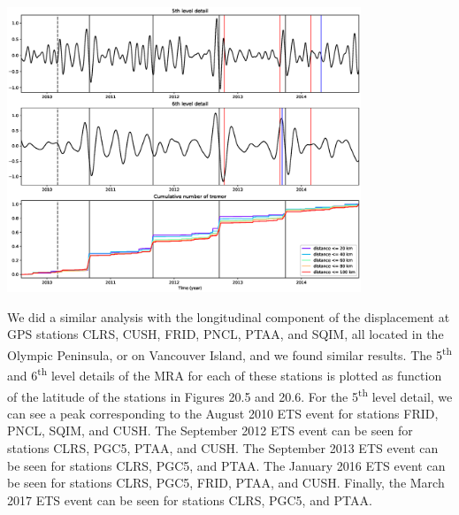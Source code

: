 \documentclass[main.tex]{subfiles}
\begin{document}
\begin{center}
\includegraphics[width=300pt, trim={3.5cm 2.5cm 3.5cm 3cm}, clip]{Figures/slowslip_results/Figure_4.eps}
\captionsetup{type=figure}
\end{center}

We did a similar analysis with the longitudinal component of the displacement at GPS stations CLRS, CUSH, FRID, PNCL, PTAA, and SQIM, all located in the Olympic Peninsula, or on Vancouver Island, and we found similar results. The 5\textsuperscript{th} and 6\textsuperscript{th} level details of the MRA for each of these stations is plotted as function of the latitude of the stations in Figures 20.5 and 20.6. For the 5\textsuperscript{th} level detail, we can see a peak corresponding to the August 2010 ETS event for stations FRID, PNCL, SQIM, and CUSH. The September 2012 ETS event can be seen for stations CLRS, PGC5, PTAA, and CUSH. The September 2013 ETS event can be seen for stations CLRS, PGC5, and PTAA. The January 2016 ETS event can be seen for stations CLRS, PGC5, FRID, PTAA, and CUSH. Finally, the March 2017 ETS event can be seen for stations CLRS, PGC5, and PTAA.
\end{document}

